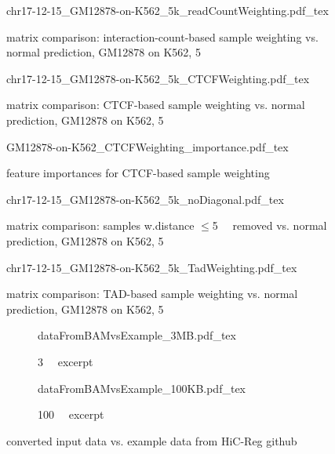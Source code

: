 \begin{appendices}
 \begin{figure}[hb]
 \centering
 \scriptsize
 {chr17-12-15_GM12878-on-K562_5k_readCountWeighting.pdf_tex}
 \caption{matrix comparison: interaction-count-based sample weighting vs. normal prediction, GM12878 on K562, \SI{5}{\kilo\bp}}
 \label{fig:app:GM12878:K562:chr17:interactionCountWeighting:matrices}
\end{figure}

 \begin{figure}[hb]
 \centering
 \scriptsize
 {chr17-12-15_GM12878-on-K562_5k_CTCFWeighting.pdf_tex}
 \caption{matrix comparison: CTCF-based sample weighting vs. normal prediction, GM12878 on K562, \SI{5}{\kilo\bp}}
 \label{fig:app:GM12878:K562:chr17:CTCFWeighting:matrices}
\end{figure}

 \begin{figure}[hb]
 \centering
 \scriptsize
 {GM12878-on-K562_CTCFWeighting_importance.pdf_tex}
 \caption{feature importances for CTCF-based sample weighting}
 \label{fig:app:GM12878:K562:chr17:CTCFWeighting:importances}
\end{figure}

 \begin{figure}[hb]
 \centering
 \scriptsize
 {chr17-12-15_GM12878-on-K562_5k_noDiagonal.pdf_tex}
 \caption{matrix comparison: samples w.\;distance $\leq$\SI{5}{\kilo\bp} removed vs. normal prediction, GM12878 on K562, \SI{5}{\kilo\bp}}
 \label{fig:app:GM12878:K562:chr17:noDiagonal}
\end{figure}

 \begin{figure}[hb]
 \centering
 \scriptsize
 {chr17-12-15_GM12878-on-K562_5k_TadWeighting.pdf_tex}
 \caption{matrix comparison: TAD-based sample weighting vs. normal prediction, GM12878 on K562, \SI{5}{\kilo\bp}}
 \label{fig:app:GM12878:K562:chr17:TadWeighting}
\end{figure}

\begin{figure}[hb]
 \centering
 \begin{subfigure}{\linewidth}
  \scriptsize
  {dataFromBAMvsExample_3MB.pdf_tex}
  \caption{\SI{3}{\mega\bp} excerpt}
  \label{fig:app:GM12878:CTCF:convertedInput3MB}
 \end{subfigure} 
 
 \vspace*{5mm}
 
\begin{subfigure}{\linewidth}
 \scriptsize
  {dataFromBAMvsExample_100KB.pdf_tex}
  \caption{\SI{100}{\kilo\bp} excerpt}
  \label{fig:app:GM12878:CTCF:convertedInput100KB}
\end{subfigure}
 \caption{converted input data vs. example data from HiC-Reg github}
\end{figure}




\end{appendices}
